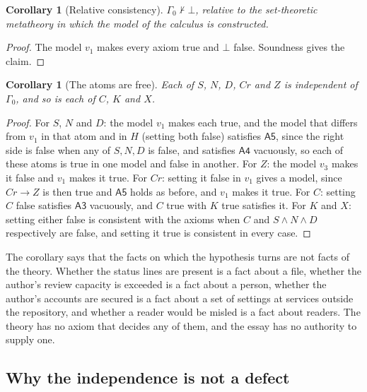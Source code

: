 \documentclass[11pt]{article}
\theoremstyle{plain}
\newtheorem{corollary}[theorem]{Corollary}
\theoremstyle{definition}
\theoremstyle{remark}
\newcommand{\Hyp}{H}
\begin{document}
\begin{corollary}[Relative consistency]\label{cor:consistent}
$\Gamma_0\not\vdash\bot$, relative to the set-theoretic metatheory in which the model of the calculus is constructed.
\end{corollary}

\begin{proof}
The model $v_1$ makes every axiom true and $\bot$ false. Soundness gives the claim. \qedhere
\end{proof}

\begin{corollary}[The atoms are free]\label{cor:free}
Each of $S$, $N$, $D$, $\mathit{Cr}$ and $Z$ is independent of $\Gamma_0$, and so is each of $C$, $K$ and $X$.
\end{corollary}

\begin{proof}
For $S$, $N$ and $D$: the model $v_1$ makes each true, and the model that differs from $v_1$ in that atom and in $\Hyp$ (setting both false) satisfies $\mathsf{A5}$, since the right side is false when any of $S,N,D$ is false, and satisfies $\mathsf{A4}$ vacuously, so each of these atoms is true in one model and false in another. For $Z$: the model $v_3$ makes it false and $v_1$ makes it true. For $\mathit{Cr}$: setting it false in $v_1$ gives a model, since $\mathit{Cr}\to Z$ is then true and $\mathsf{A5}$ holds as before, and $v_1$ makes it true. For $C$: setting $C$ false satisfies $\mathsf{A3}$ vacuously, and $C$ true with $K$ true satisfies it. For $K$ and $X$: setting either false is consistent with the axioms when $C$ and $S\land N\land D$ respectively are false, and setting it true is consistent in every case. \qedhere
\end{proof}

The corollary says that the facts on which the hypothesis turns are not facts of the theory. Whether the status lines are present is a fact about a file, whether the author's review capacity is exceeded is a fact about a person, whether the author's accounts are secured is a fact about a set of settings at services outside the repository, and whether a reader would be misled is a fact about readers. The theory has no axiom that decides any of them, and the essay has no authority to supply one.

\subsection{Why the independence is not a defect}
\end{document}
